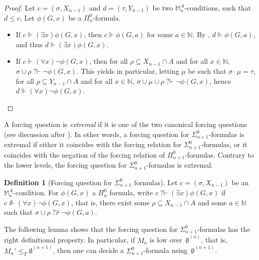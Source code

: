 \documentclass{article}
\def\NN{\mathbb{N}}
\def\MM{\mathbb{M}}
\def\M{\mathcal{M}}
\newcommand{\qvdash}{\operatorname{{?}{\vdash}}}
\newcommand{\nqvdash}{\operatorname{{?}{\nvdash}}}
\numberwithin{theorem}{section}
\newtheorem{lemma}[theorem]{Lemma}
\theoremstyle{definition}
\newtheorem{definition}[theorem]{Definition}
\begin{document}
\begin{proof}
    Let $c = ( \sigma,X_{n-1})$ and $d = (\tau,Y_{n-1})$ be two $\MM_n^A$-conditions, such that $d \leq c$. Let $\phi(G, x)$ be a $\Pi^0_n$-formula.
      \begin{itemize}
        \item If $c \Vdash (\exists x)\phi(G, x)$, then $c \Vdash \phi(G,a)$ for some $a \in \NN$. By , $d \Vdash \phi(G,a)$, and thus $d \Vdash (\exists x)\phi(G, x)$.
         \item If $c \Vdash (\forall x)\neg \phi(G, x)$, then for all $\rho \subseteq X_{n-1} \cap A$ and for all $x \in \NN$, $\sigma \cup \rho \qvdash \neg \phi(G,x)$. This yields in particular, letting $\mu$ be such that $\sigma \cdot \mu = \tau$, for all $\rho \subseteq Y_{n-1} \cap A$ and for all $x \in \NN$, $\sigma \cup \mu \cup \rho \qvdash \neg \phi(G,x)$, hence $d \Vdash (\forall x)\neg \phi(G, x)$.
    \end{itemize}
\end{proof}

A forcing question is \emph{extremal} if it is one of the two canonical forcing questions (see discussion after ). In other words, a forcing question for $\Sigma^0_{n+1}$-formulas is extremal if either it coincides with the forcing relation for $\Sigma^0_{n+1}$-formulas, or it coincides with the negation of the forcing relation of $\Pi^0_{n+1}$-formulas. Contrary to the lower levels, the forcing question for $\Sigma^0_{n+1}$-formulas is extremal.

\begin{definition}[Forcing question for $\Sigma^0_{n+1}$ formulas]
Let $c = (\sigma,X_{n-1})$ be an $\MM^A_n$-condition.
For $\phi(G,x)$ a $\Pi_n^0$ formula, write $c \qvdash (\exists x)\phi(G,x)$ if $c \not \Vdash (\forall x)\neg \phi(G, x)$, that is, there exist some $\rho \subseteq X_{n-1} \cap A$ and some $a \in \NN$ such that $\sigma \cup \rho \nqvdash \neg \phi(G, a)$.
\end{definition}

The following lemma shows that the forcing question for $\Sigma^0_{n+1}$-formulas has the right definitional property. In particular, if $M_n$ is low over~$\emptyset^{(n)}$, that is, $M_n' \leq_T \emptyset^{(n+1)}$, then one can decide a $\Sigma^0_{n+1}$-formula using~$\emptyset^{(n+1)}$.

\end{document}
